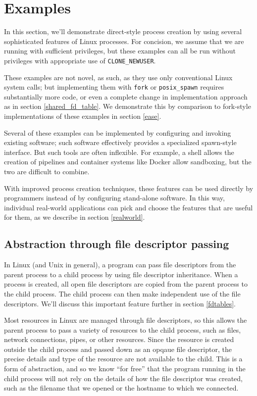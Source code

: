 \documentclass[letterpaper,twocolumn,10pt]{article}
\begin{document}
\section{Examples}\label{examples}
In this section,
we'll demonstrate direct-style process creation
by using several sophisticated features of Linux processes.
For concision, we assume that we are running with sufficient privileges,
but these examples can all be run without privileges with appropriate use of \verb|CLONE_NEWUSER|.
\cite{user_namespaces}\cite{unpriv_fuse}

These examples are not novel, as such, as they use only conventional Linux system calls;
but implementing them with \texttt{fork} or \verb|posix_spawn| requires substantially more code,
or even a complete change in implementation approach as in section \ref{shared_fd_table}.
We demonstrate this by comparison to fork-style implementations of these examples in section \ref{ease}.

Several of these examples can be implemented by configuring and invoking existing software;
such software effectively provides a specialized spawn-style interface.
But such tools are often inflexible.
For example, a shell allows the creation of pipelines and container systems like Docker allow sandboxing,
but the two are difficult to combine.\cite{docker_pipe}

With improved process creation techniques,
these features can be used directly by programmers
instead of by configuring stand-alone software.
In this way,
individual real-world applications can pick and choose the features that are useful for them,
as we describe in section \ref{realworld}.
\subsection{Abstraction through file descriptor passing}\label{fd_abstraction}
In Linux (and Unix in general),
a program can pass file descriptors from the parent process to a child process
by using file descriptor inheritance.\cite{tlpi}
When a process is created, all open file descriptors are copied from the parent process to the child process.
The child process can then make independent use of the file descriptors.
We'll discuss this important feature further in section \ref{fdtables}.

Most resources in Linux are managed through file descriptors,
so this allows the parent process to pass a variety of resources to the child process,
such as files, network connections, pipes, or other resources.\cite{ucspi}
Since the resource is created outside the child process and passed down as an opqaue file descriptor,
the precise details and type of the resource are not available to the child.
This is a form of abstraction,
and so we know ``for free''
that the program running in the child process
will not rely on the details of how the file descriptor was created,
such as the filename that we opened or the hostname to which we connected.\cite{theoremsforfree}
\end{document}
